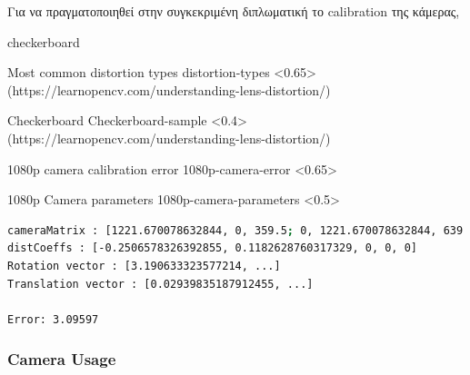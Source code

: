 Για να πραγματοποιηθεί στην συγκεκριμένη διπλωματική το calibration της κάμερας, 

checkerboard


%
{Most common distortion types}%
{distortion-types}%
<0.65>%
(https://learnopencv.com/understanding-lens-distortion/)


%
{Checkerboard}%
{Checkerboard-sample}%
<0.4>%
(https://learnopencv.com/understanding-lens-distortion/)

%
{1080p camera calibration error}%
{1080p-camera-error}%
<0.65>

%
{1080p Camera parameters}%
{1080p-camera-parameters}%
<0.5>

\begin{lstlisting}[basicstyle=\small, language=bash, escapechar=@, caption={I2C addressed output example},label=list:I2C-output]
cameraMatrix : [1221.670078632844, 0, 359.5; 0, 1221.670078632844, 639.5; 0, 0, 1]
distCoeffs : [-0.2506578326392855, 0.1182628760317329, 0, 0, 0]
Rotation vector : [3.190633323577214, ...]
Translation vector : [0.02939835187912455, ...]
   
Error: 3.09597
\end{lstlisting}

\subsubsection{Camera Usage} \label{sec:camera-usage}

